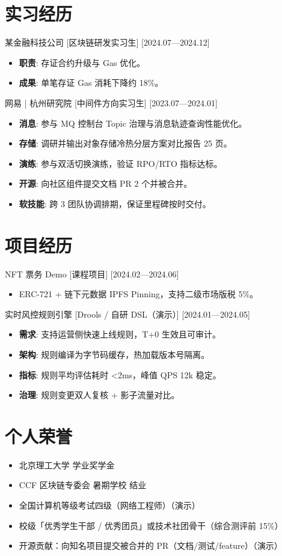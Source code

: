 \documentclass{resume-photo}
\begin{document}
\section{实习经历}
\ResumeItem
{某金融科技公司}
[\textnormal{区块链研发实习生}]
[2024.07—2024.12]

\begin{itemize}
  \item \textbf{职责}: 存证合约升级与 Gas 优化。
  \item \textbf{成果}: 单笔存证 Gas 消耗下降约 18\%。
\end{itemize}


\ResumeItem
{网易 | 杭州研究院}
[\textnormal{中间件方向实习生}]
[2023.07—2024.01]

\begin{itemize}
  \item \textbf{消息}: 参与 MQ 控制台 Topic 治理与消息轨迹查询性能优化。
  \item \textbf{存储}: 调研并输出对象存储冷热分层方案对比报告 25 页。
  \item \textbf{演练}: 参与双活切换演练，验证 RPO/RTO 指标达标。
  \item \textbf{开源}: 向社区组件提交文档 PR 2 个并被合并。
  \item \textbf{软技能}: 跨 3 团队协调排期，保证里程碑按时交付。
\end{itemize}



\section{项目经历}
\ResumeItem
{NFT 票务 Demo}
[\textnormal{课程项目}]
[2024.02—2024.06]

\begin{itemize}
  \item ERC-721 + 链下元数据 IPFS Pinning，支持二级市场版税 5\%。
\end{itemize}


\ResumeItem
{实时风控规则引擎}
[\textnormal{Drools / 自研 DSL（演示）}]
[2024.01—2024.05]

\begin{itemize}
  \item \textbf{需求}: 支持运营侧快速上线规则，T+0 生效且可审计。
  \item \textbf{架构}: 规则编译为字节码缓存，热加载版本号隔离。
  \item \textbf{指标}: 规则平均评估耗时 <2ms，峰值 QPS 12k 稳定。
  \item \textbf{治理}: 规则变更双人复核 + 影子流量对比。
\end{itemize}



\section{个人荣誉}
\begin{itemize}
  \item 北京理工大学 学业奖学金
  \item CCF 区块链专委会 暑期学校 结业
  \item 全国计算机等级考试四级（网络工程师）（演示）
  \item 校级「优秀学生干部 / 优秀团员」或技术社团骨干（综合测评前 15\%）
  \item 开源贡献：向知名项目提交被合并的 PR（文档/测试/feature）（演示）
\end{itemize}
\end{document}

